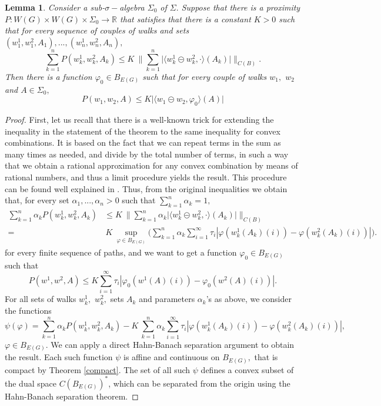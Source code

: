 \documentclass[preprint,12pt]{elsarticle}
\newtheorem{lemma}[theorem]{Lemma}
\begin{document}
\begin{lemma} \label{1conca}
Consider a sub-$\sigma-$algebra $\Sigma_0$ of $\Sigma.$
Suppose that there is a proximity $P: W(G) \times W(G) \times \Sigma_0 \to \mathbb R$ that satisfies that  there is a constant $K>0$ such that for every sequence of couples of walks and sets $(w^1_1,w^2_1,A_1), ..., (w^1_n, w^2_n,A_n),$
$$
\sum_{k=1}^n P(w^1_k,w^2_k,A_k) \le K \ \Big\|
 \sum_{k=1}^n \big| \langle w^1_k \circleddash w^2_k, \cdot \rangle (A_k) \big| \Big\|_{C(B)}.
$$
Then there is a function $\varphi_0 \in B_{E(G)}$ such that for every couple of walks $w_1,$ $w_2$ and $A \in \Sigma_0,$
$$
P(w_1,w_2,A) \le K \big| \langle w_1 \circleddash w_2, \varphi_0 \rangle (A) \big| 
$$
\end{lemma}
\begin{proof}
First, let us recall that there is a well-known trick for extending the inequality in the statement of the theorem to the same inequality for convex combinations. It is based on the fact that we can repeat terms in the sum as many times as needed, and divide by the total number of terms, in such a way that we obtain a rational approximation for any convex combination by means of rational numbers, and thus a limit procedure yields the result. This procedure can be found well explained in \cite{far}.
Thus, from the original inequalities  we obtain that, for every set $\alpha_1,...,\alpha_n >0$ such that $\sum_{k=1}^n \alpha_k=1,$
\begin{align*}
\sum_{k=1}^n \alpha_k P(w^1_k,w^2_k,A_k) &\le K \ \Big\| \sum_{k=1}^n \alpha_k \big| \langle w^1_k \circleddash w^2_k, \cdot \rangle (A_k) \big| \Big\|_{C(B)}\\
 = & \, K \ \sup_{\varphi \in B_{E(G)}}
\Big( \sum_{k=1}^n \alpha_k \sum_{i=1}^\infty \tau_i| \varphi(w^1_k(A_k)(i))- \varphi(w^2_k(A_k)(i))| \Big).
\end{align*}
for every finite sequence of paths, and we want to get a function $\varphi_0 \in B_{E(G)}$ such that 
$$
P(w^1,w^2,A) \le K \sum_{i=1}^\infty \tau_i| \varphi_0(w^1(A)(i))- \varphi_0(w^2(A)(i))|.
$$
For all sets of walks $w^1_k,$ $w^2_k,$ sets $A_k$ and parameters $\alpha_k$'s as above, we consider the functions
$$
\psi(\varphi)=\sum_{k=1}^n \alpha_k P(w^1_k,w^2_k,A_k) - K \ 
 \sum_{k=1}^n \alpha_k \sum_{i=1}^\infty \tau_i| \varphi(w^1_k(A_k)(i))- \varphi(w^2_k(A_k)(i))|,
$$
$\varphi \in B_{E(G)}.$
We can apply a direct Hahn-Banach separation argument to obtain the result. 
Each such function \( \psi \) is affine and continuous on $ B_{E(G)},$
that is compact by Theorem \ref{compact}. The set of all such \( \psi \) defines a convex subset of the dual space \( C(B_{E(G)})^* \), which can be separated from the origin using the Hahn-Banach separation theorem.


\end{proof}
\end{document}
